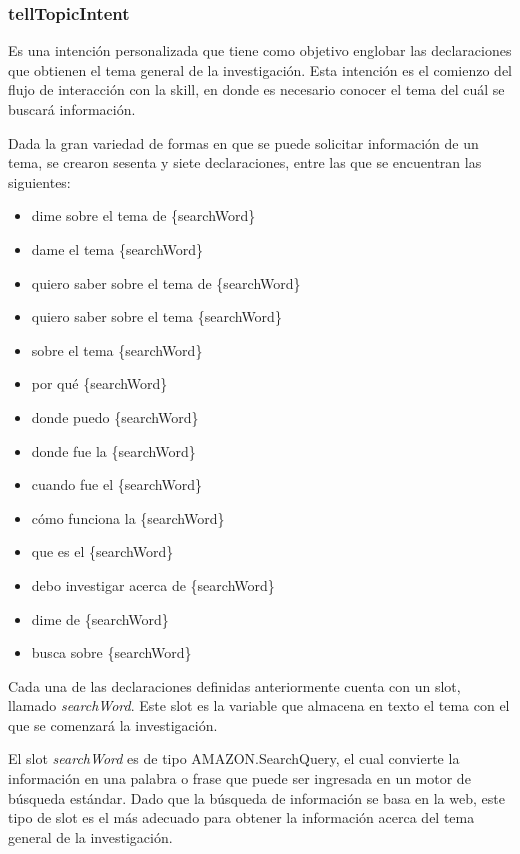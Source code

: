 
\subsubsection{tellTopicIntent}
\label{tellTopicIntentcapIV}

Es una intención personalizada que tiene como objetivo englobar las declaraciones que obtienen el tema general de la investigación. Esta intención es el comienzo del flujo de interacción con la skill, en donde es necesario conocer el tema del cuál se buscará información.

Dada la gran variedad de formas en que se puede solicitar información de un tema, se crearon sesenta y siete declaraciones, entre las que se encuentran las siguientes:

\begin{itemize}
  \item dime sobre el tema de \{searchWord\}
  \item dame el tema \{searchWord\}
  \item quiero saber sobre el tema de \{searchWord\}
  \item quiero saber sobre el tema \{searchWord\}
  \item sobre el tema \{searchWord\}
  \item por qué \{searchWord\}
  \item donde puedo \{searchWord\}
  \item donde fue la \{searchWord\}
  \item cuando fue el \{searchWord\}
  \item cómo funciona la \{searchWord\}
  \item que es el \{searchWord\}
  \item debo investigar acerca de \{searchWord\}
  \item dime de \{searchWord\}
  \item busca sobre \{searchWord\}
\end{itemize}

Cada una de las declaraciones definidas anteriormente cuenta con un slot, llamado \textit{searchWord}. Este slot es la variable que almacena en texto el tema con el que se comenzará la investigación.

El slot \textit{searchWord} es de tipo AMAZON.SearchQuery, el cual convierte la información en una palabra o frase que puede ser ingresada en un motor de búsqueda estándar. Dado que la búsqueda de información se basa en la web, este tipo de slot es el más adecuado para obtener la información acerca del tema general de la investigación.


